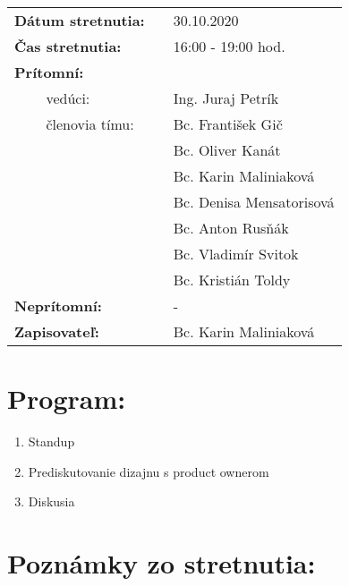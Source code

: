 \documentclass{article}
\begin{document}
    

    \begin{table}[h]
        \begin{tabular}{lllll}
            \multicolumn{3}{l}{\textbf{Dátum stretnutia:}} & & 30.10.2020 \\
            \multicolumn{3}{l}{\textbf{Čas stretnutia:}} & & 16:00 - 19:00 hod. \\
            \multicolumn{3}{l}{\textbf{Prítomní:}} \\
            & & vedúci: & & Ing. Juraj Petrík \\
            & & členovia tímu: & & Bc. František Gič  \\
            & & & & Bc. Oliver Kanát \\
            & & & & Bc. Karin Maliniaková \\
            & & & & Bc. Denisa Mensatorisová \\
            & & & & Bc. Anton Rusňák \\
            & & & & Bc. Vladimír Svitok \\
            & & & & Bc. Kristián Toldy \\
            \multicolumn{3}{l}{\textbf{Neprítomní:}} & & -\\
            \multicolumn{3}{l}{\textbf{Zapisovateľ:}} & & Bc. Karin Maliniaková \\
        \end{tabular}
        \label{tab:grades}
    \end{table}

    \section*{Program:}

    \begin{enumerate}
        \item Standup
        \item Prediskutovanie dizajnu s product ownerom
        \item Diskusia
    \end{enumerate}

    \section*{Poznámky zo stretnutia:}
\end{document}

